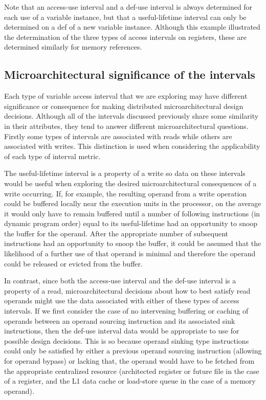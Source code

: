 \documentclass[10pt,dvips]{article}
\begin{document}
Note that an access-use interval and a def-use interval is always 
determined for each
use of a variable instance, but that a useful-lifetime interval can
only be determined on a def of a new variable instance.
Although this example illustrated the determination of
the three types of access intervals on registers, these are
determined similarly for memory references.
%
\subsection{Microarchitectural significance of the intervals}
%
Each type of variable access interval that we are exploring
may have different significance or consequence 
for making distributed microarchitectural design decisions.
Although all of the intervals discussed previously share
some similarity in their
attributes, they tend to answer different microarchitectural
questions.
Firstly some types of intervals are associated with reads
while others are associated with writes.
This distinction is used when considering the applicability of each
type of interval metric.

The useful-lifetime interval is a property of a write
so data on these intervals would be useful when exploring
the desired microarchitectural consequences of a write occurring.
If, for example, the resulting operand from a write operation
could be buffered locally near the execution units in the processor,
on the average it would only have to remain buffered until
a number of following instructions (in dynamic program order)
equal to its
useful-lifetime had an opportunity to snoop the buffer for the
operand.
After the appropriate number of subsequent instructions had an 
opportunity to snoop the buffer, it could be assumed that
the likelihood of a further use of that operand is minimal
and therefore the operand could be released or evicted from the
buffer.

In contrast, since both the access-use interval and the def-use
interval is a property of a read, microarchitectural decisions
about how to best satisfy read operands might use the data associated
with either of these types of access intervals.
If we first consider the case of no intervening buffering or caching
of operands between an operand sourcing instruction and its
associated sink instructions, then the def-use interval data would
be appropriate to use for possible design decisions.
This is so because operand sinking type instructions could only
be satisfied by either a previous operand sourcing instruction
(allowing for operand bypass) or lacking that, the operand would have to be
fetched from the appropriate centralized resource (architected
register or future file in the case of a register, and the L1 data
cache or load-store queue in the case of a memory operand).
\end{document}
